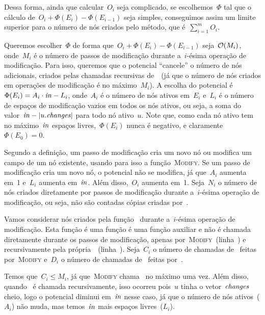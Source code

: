\documentclass[../../main.tex]{subfiles}
\begin{document}
Dessa forma, ainda que calcular~$O_i$ seja complicado, se escolhemos~$\Phi$ tal que o cálculo de~${O_i + \Phi(E_i) - \Phi(E_{i-1})}$ seja simples, conseguimos assim um limite superior para o número de nós criados pelo método, que é~$\sum\limits_{i=1}^m{O_i}$.

Queremos escolher~$\Phi$ de forma que~${O_i + \Phi(E_i) - \Phi(E_{i-1})}$ seja~$\mathcal{O}(M_i)$, onde~$M_i$ é o número de passos de modificação durante a~$i$-ésima operação de modificação. Para isso, queremos que o potencial ``cancele'' o número de nós adicionais, criados pelas chamadas recursivas de~\textsc{}~(já que o número de nós criados em operações de modificação é no máximo~$M_i$). A escolha do potencial é~$\Phi(E_i) = A_i \cdot \mathit{in} - L_i$, onde~$A_i$ é o número de nós ativos em~$E_i$ e~$L_i$ é o número de espaços de modificação vazios em todos os nós ativos, ou seja, a soma do valor~$\mathit{in} - |u.\mathit{changes}|$ para todo nó ativo~$u$. Note que, como cada nó ativo tem no máximo~$\mathit{in}$ espaços livres,~$\Phi(E_i)$ nunca é negativo, e claramente~$\Phi(E_0) = 0$.

Segundo a definição, um passo de modificação cria um novo nó ou modifica um campo de um nó existente, usando para isso a função~\textsc{Modify}. Se um passo de modificação cria um novo nó, o potencial não se modifica, já que~$A_i$ aumenta em~1 e~$L_i$ aumenta em~$\mathit{in}$. Além disso,~$O_i$ aumenta em~1. Seja~$N_i$ o número de nós criados diretamente por passos de modificação durante a~$i$-ésima operação de modificação, ou seja, não são contadas cópias criadas por~\textsc{}.

Vamos considerar nós criados pela função~\textsc{} durante a~$i$-ésima operação de modificação. Esta função é uma função é uma função auxiliar e não é chamada diretamente durante os passos de modificação, apenas por~\textsc{Modify}~(linha~) e recursivamente pela própria~\textsc{}~(linha~). Seja~$C_i$ o número de chamadas de~\textsc{} feitas por~\textsc{Modify} e~$D_i$ o número de chamadas de~\textsc{} feitas por~\textsc{}.

Temos que~$C_i \leq M_i$, já que~\textsc{Modify} chama~\textsc{} no máximo uma vez. Além disso, quando~ é chamada recursivamente, isso ocorreu pois~$u$ tinha o vetor~$\mathit{changes}$ cheio, logo o potencial diminui em~$\mathit{in}$ nesse caso, já que o número de nós ativos~($A_i$) não muda, mas temos~$\mathit{in}$ mais espaços livres~($L_i$).
\end{document}
